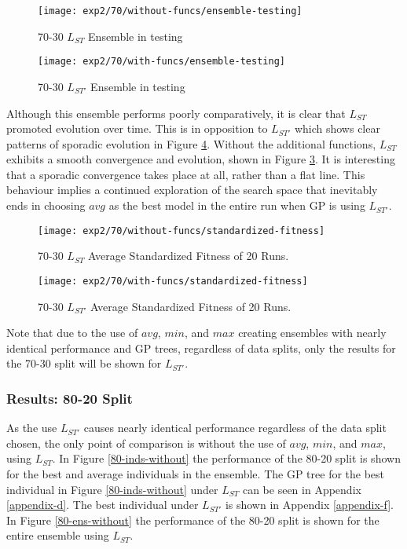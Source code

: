 \documentclass[12pt, letterpaper]{article}
\begin{document}
\begin{figure}[!htb]
\centering
\texttt{[image: exp2/70/without-funcs/ensemble-testing]}
\caption{ 70-30 $L_{ST}$ Ensemble in testing}
\label{70-ens-without}
\end{figure}

\begin{figure}[!htb]
\centering
\texttt{[image: exp2/70/with-funcs/ensemble-testing]}
\caption{ 70-30 $L_{ST'}$ Ensemble in testing}
\label{70-ens-with}
\end{figure}

\textrm{ \indent Although this ensemble performs poorly comparatively, it is clear that $L_{ST}$ promoted evolution over time. This is in opposition to $L_{ST'}$ which shows clear patterns of sporadic evolution in Figure \ref{70-stdfit-with}. Without the additional functions, $L_{ST}$ exhibits a smooth convergence and evolution, shown in Figure \ref{70-stdfit-without}. It is interesting that a sporadic convergence takes place at all, rather than a flat line. This behaviour implies a continued exploration of the search space that inevitably ends in choosing $avg$ as the best model in the entire run when GP is using $L_{ST'}$. }

\begin{figure}[!htb]
\centering
\texttt{[image: exp2/70/without-funcs/standardized-fitness]}
\caption{ 70-30 $L_{ST}$ Average Standardized Fitness of 20 Runs.}
\label{70-stdfit-without}
\end{figure}

\begin{figure}[!htb]
\centering
\texttt{[image: exp2/70/with-funcs/standardized-fitness]}
\caption{70-30 $L_{ST'}$ Average Standardized Fitness of 20 Runs. }
\label{70-stdfit-with}
\end{figure}

\textrm{ \indent Note that due to the use of $avg$, $min$, and $max$ creating ensembles with nearly identical performance and GP trees, regardless of data splits, only the results for the 70-30 split will be shown for $L_{ST'}$. }

\subsubsection{Results: 80-20 Split}

\textrm{\indent As the use $L_{ST'}$ causes nearly identical performance regardless of the data split chosen, the only point of comparison is without the use of $avg$, $min$, and $max$, using $L_{ST}$. In Figure \ref{80-inds-without} the performance of the 80-20 split is shown for the best and average individuals in the ensemble. The GP tree for the best individual in Figure \ref{80-inds-without} under $L_{ST}$ can be seen in Appendix \ref{appendix-d}. The best individual under $L_{ST'}$ is shown in Appendix \ref{appendix-f}. In Figure \ref{80-ens-without} the performance of the 80-20 split is shown for the entire ensemble using $L_{ST}$. }
\end{document}
